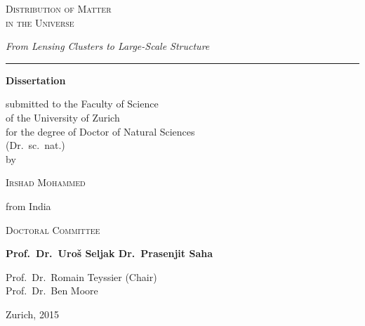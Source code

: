\documentclass[
  11pt,
  twoside,
  openright,
  titlepage,
  headings=optiontoheadandtoc
]{scrbook}
\begin{document}
\cleardoublepage

\begin{titlepage}
  \thispagestyle{empty}
  \centering

  \vspace*{0.075\textheight}

  {\fontsize{22}{27}\selectfont
   \scshape
   Distribution of Matter\\
   in the Universe\par}

  \vspace{0.75em}

  {\fontsize{12.5}{16}\selectfont
   \itshape
   From Lensing Clusters to Large-Scale Structure\par}

  \vspace{1.5em}
  {\color{black!55}\rule{0.34\textwidth}{0.5pt}\par}

  \vfill

  {\large\bfseries Dissertation\par}

  \vspace{0.9em}

  {\small
   submitted to the Faculty of Science\\
   of the University of Zurich\\[0.75em]
   for the degree of Doctor of Natural Sciences\\
   (Dr.~sc.~nat.)\\[0.75em]
   by\par}

  \vspace{0.45em}
  {\Large\scshape Irshad Mohammed\par}
  \vspace{0.35em}
  {\small from India\par}

  \vfill

  \begin{minipage}{0.76\textwidth}
    \centering
    {\small\scshape Doctoral Committee\par}
    \vspace{0.65em}
    {\normalsize\bfseries
     Prof.~Dr.~Uro\v{s} Seljak
     \quad\textperiodcentered\quad
     Dr.~Prasenjit Saha\par}
    \vspace{0.65em}
    {\small
     Prof.~Dr.~Romain Teyssier (Chair)\\
     Prof.~Dr.~Ben Moore\par}
  \end{minipage}

  \vfill

  {\small Zurich, 2015\par}

  \vspace*{0.04\textheight}
\end{titlepage}
\end{document}
